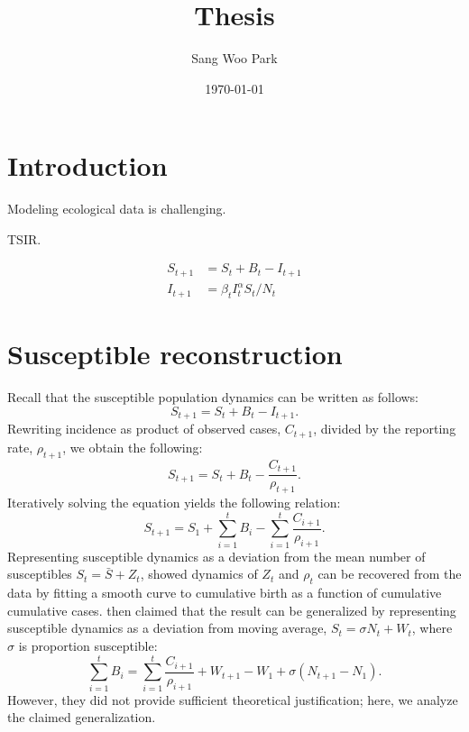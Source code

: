 \documentclass{article}
\title{Thesis}
\date{\today}
\author{Sang Woo Park}
\begin{document}
\maketitle

\section{Introduction}

Modeling ecological data is challenging.

TSIR.

\begin{equation}
\begin{aligned}
S_{t+1} &= S_t + B_t - I_{t+1}\\
I_{t+1} &= \beta_t I_{t}^\alpha S_t/N_t
\end{aligned}
\end{equation}

\section{Susceptible reconstruction}

Recall that the susceptible population dynamics can be written as follows:
\begin{equation}
S_{t+1} = S_{t} + B_t - I_{t+1}.
\end{equation}
Rewriting incidence as product of observed cases, $C_{t+1}$, divided by the reporting rate, $\rho_{t+1}$, we obtain the following:
\begin{equation}
S_{t+1} = S_t + B_t - \frac{C_{t+1}}{\rho_{t+1}}.
\end{equation}
Iteratively solving the equation yields the following relation:
\begin{equation}
S_{t+1} =  S_1 + \sum_{i=1}^t B_i - \sum_{i=1}^t \frac{C_{i+1}}{\rho_{i+1}}.
\label{eq:sus}
\end{equation}
Representing susceptible dynamics as a deviation from the mean number of susceptibles $S_t = \bar{S} + Z_t$, \cite{finkenstadt2000time} showed dynamics of $Z_t$ and $\rho_t$ can be recovered from the data by fitting a smooth curve to cumulative birth as a function of cumulative cumulative cases. 
\cite{dalziel2016persistent} then claimed that the result can be generalized by representing susceptible dynamics as a deviation from moving average, $S_t = \sigma N_t + W_t$, where $\sigma$ is proportion susceptible:
\begin{equation}
\sum_{i=1}^t B_i = \sum_{i=1}^t \frac{C_{i+1}}{\rho_{i+1}} + W_{t+1} - W_1 + \sigma (N_{t+1} - N_1).
\label{eq:gensus}
\end{equation}
However, they did not provide sufficient theoretical justification; here, we analyze the claimed generalization.
\end{document}
